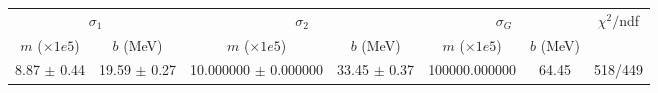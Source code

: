 \begin{tabular}{cc|cc|cc||c}
\multicolumn{2}{c|}{$\sigma_1$} & \multicolumn{2}{|c}{$\sigma_2$} & \multicolumn{2}{|c}{$\sigma_G$}  & \multirow{2}{*}{$\chi^2/$ndf}\\
$m$ ($\times1e5$) & $b$ (MeV) & $m$ ($\times1e5$) & $b$ (MeV) & $m$ ($\times1e5$) & $b$ (MeV) & \\
\hline
8.87 $\pm$ 0.44 & 19.59 $\pm$ 0.27 & 10.000000 $\pm$ 0.000000 & 33.45 $\pm$ 0.37 & 100000.000000 & 64.45 & 518/449\\
\end{tabular}
